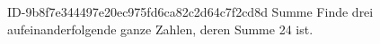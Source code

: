 \begin{exercise}
      {ID-9b8f7e344497e20ec975fd6ca82c2d64c7f2cd8d}
      {Summe}
  \ifproblem\problem
    Finde drei aufeinanderfolgende ganze Zahlen, deren Summe 24 ist.
  \fi
\end{exercise}

